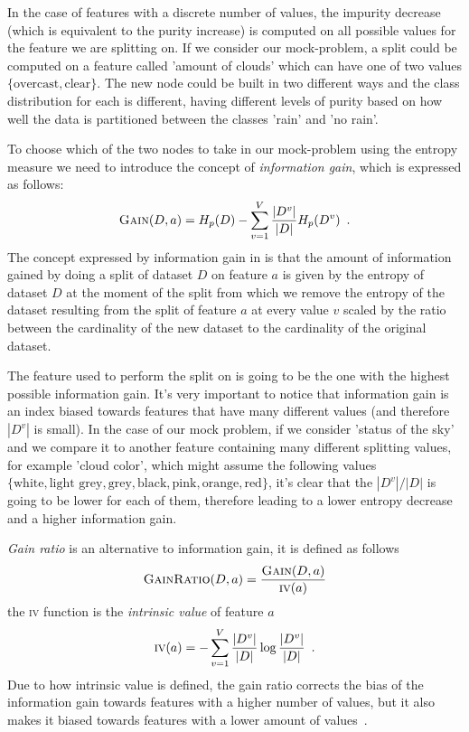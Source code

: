 \smallskip

In the case of features with a discrete number of values, the impurity decrease (which is equivalent
to the purity increase) is computed on all possible values for the feature we are splitting on. If we consider our mock-problem, a split could be computed on a feature called 'amount of clouds' which can have one of two values $\{\text{overcast}, \text{clear}\}$. The new node could be built in two different ways and the class distribution for each is different, having different levels of purity based on how well the data is partitioned between the classes 'rain' and 'no rain'.

\smallskip

To choose which of the two nodes to take in our mock-problem using the entropy measure we need to
introduce the concept of \emph{information gain}, which is expressed as follows:
\begin{equation}
	\label{eq:information-gain}
	\textsc{Gain}(D, a) = H_p(D) - \sum_{v = 1}^V\frac{|D^v|}{|D|}H_p(D^v) \enspace.
\end{equation}
The concept expressed by information gain in is that the amount of information gained by doing a split of dataset $D$ on feature $a$ is given by the entropy of dataset $D$ at the moment of the split from which we remove the entropy of the dataset resulting from the split of feature $a$ at every value $v$ scaled by the ratio between the cardinality of the new dataset to the cardinality of the original dataset.

\smallskip

The feature used to perform the split on is going to be the one with the highest possible
information gain. It's very important to notice that information gain is an index biased towards
features that have many different values (and therefore $|D^v|$ is small). In the case of our mock
problem, if we consider 'status of the sky' and we compare it to another feature containing many
different splitting values, for example 'cloud color', which might assume the following values
$\{\text{white}, \text{light grey}, \text{grey}, \text{black}, \text{pink}, \text{orange},
	\text{red}\}$, it's clear that the $|D^v|/|D|$ is going to be lower for each of them, therefore
leading to a lower entropy decrease and a higher information gain.

\emph{Gain ratio} is an alternative to information gain, it is defined as follows
\begin{equation}
	\label{eq:gain-ratio}
	\textsc{GainRatio}(D, a) = \frac{\textsc{Gain}(D, a)}{\textsc{iv}(a)}
\end{equation}
the \textsc{iv} function is the \emph{intrinsic value} of feature $a$
\begin{equation}
	\label{eq:intrinsic-value}
	\textsc{iv}(a) = - \sum_{v = 1}^V\frac{|D^v|}{|D|} \log{\frac{|D^v|}{|D|}} \enspace.
\end{equation}
Due to how intrinsic value is defined, the gain ratio corrects the bias of the information gain
towards features with a higher number of values, but it also makes it biased towards features with a lower amount of values~\cite{ZhouZhi-Hua2021ML}.

